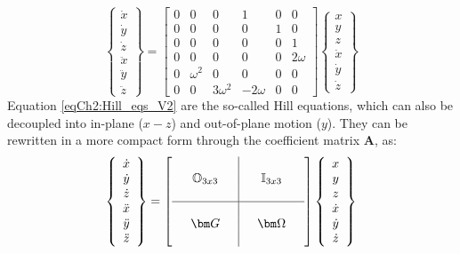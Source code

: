 	\begin{equation}
	\left\{
	\begin{array}{c}
	\dot{x}\\
	\dot{y}\\
	\dot{z}\\
	\ddot{x}\\
	\ddot{y}\\
	\ddot{z}
	\end{array}\right\}
	= 
	\left[
	\begin{array}{ccc|ccc}
	0 		& 0			& 0			& 1			& 0		& 0\\
	0 		& 0			& 0			& 0			& 1		& 0\\
	0 		& 0			& 0			& 0			& 0		& 1\\
	\hline
	0 		& 0			& 0			& 0			& 0		& 2\omega\\
	0 		& \omega^2	& 0			& 0			& 0		& 0\\
	0 		& 0			& 3\omega^2 & -2\omega	& 0		& 0
	\end{array}\right] 
	\left\{
	\begin{array}{c}
	x\\
	y\\
	z\\
	\dot{x}\\
	\dot{y}\\
	\dot{z}
	\end{array}\right\}
	\label{eqCh2:Hill_eqs_V2}
	\end{equation}
	\indent Equation \eqref{eqCh2:Hill_eqs_V2} are the so-called Hill equations, which can also be decoupled into in-plane ($x-z$) and out-of-plane motion ($y$). They can be rewritten in a more compact form through the coefficient matrix $\bm A$, as:
	\begin{equation}
	\left\{
	\begin{array}{c}
	\dot{x}\\
	\dot{y}\\
	\dot{z}\\
	\ddot{x}\\
	\ddot{y}\\
	\ddot{z}
	\end{array}\right\}
	= 
	\left[
	\begin{array}{ccc|ccc}
	  		&  					&  			&  			&  					&  \\
	 		& \mathbb{O}_{3x3}	&  			&  			& \mathbb{I}_{3x3}	&  \\
	 		& 					&  			&  			&  					&  \\
	\hline
	 	  	&  					&  			&  			&  					&  \\
	 		& \bm G				&  			&  			& \bm  \Omega		&  \\
	 		& 					&  			&  			&  					&  \\
	\end{array}\right] 
	\left\{
	\begin{array}{c}
	x\\
	y\\
	z\\
	\dot{x}\\
	\dot{y}\\
	\dot{z}
	\end{array}\right\}
	\label{eqCh2:Hill_eqs_V3}
	\end{equation}
